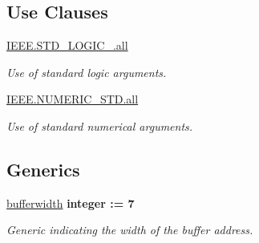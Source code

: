 \subsection*{Use Clauses}
 \begin{DoxyCompactItemize}
\item 
\hypertarget{classADC__buffer_a68c233289eaf7d2601307bdd93b4c299}{\hyperlink{classADC__buffer_a68c233289eaf7d2601307bdd93b4c299}{I\-E\-E\-E.\-S\-T\-D\-\_\-\-L\-O\-G\-I\-C\-\_.\-all}   }\label{classADC__buffer_a68c233289eaf7d2601307bdd93b4c299}

\begin{DoxyCompactList}\small\item\em Use of standard logic arguments. \end{DoxyCompactList}\item 
\hypertarget{classADC__buffer_a7c135c43c66ccd7f22abe5f6211788a5}{\hyperlink{classADC__buffer_a7c135c43c66ccd7f22abe5f6211788a5}{I\-E\-E\-E.\-N\-U\-M\-E\-R\-I\-C\-\_\-\-S\-T\-D.\-all}   }\label{classADC__buffer_a7c135c43c66ccd7f22abe5f6211788a5}

\begin{DoxyCompactList}\small\item\em Use of standard numerical arguments. \end{DoxyCompactList}\end{DoxyCompactItemize}
\subsection*{Generics}
 \begin{DoxyCompactItemize}
\item 
\hypertarget{classADC__buffer_a2f94b7b31a8914ee23be5e000f89e921}{\hyperlink{classADC__buffer_a2f94b7b31a8914ee23be5e000f89e921}{bufferwidth} {\bfseries {\bfseries \textcolor{comment}{integer}\textcolor{vhdlchar}{ }\textcolor{vhdlchar}{\-:}\textcolor{vhdlchar}{=}\textcolor{vhdlchar}{ } \textcolor{vhdldigit}{7} \textcolor{vhdlchar}{ }}}}\label{classADC__buffer_a2f94b7b31a8914ee23be5e000f89e921}

\begin{DoxyCompactList}\small\item\em Generic indicating the width of the buffer address. \end{DoxyCompactList}\end{DoxyCompactItemize}
